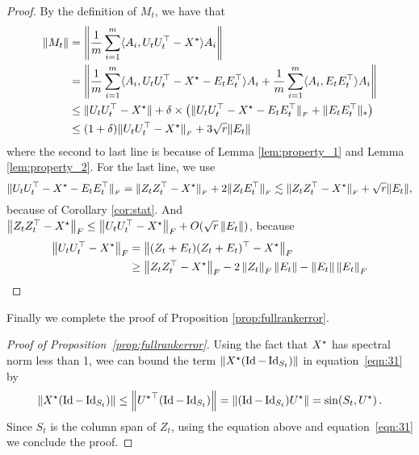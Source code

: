 \begin{proof}
	By the definition of $M_t$, we have that
	\begin{align}
		\|M_t\| & = \left\|\frac 1 m \sum_{i=1}^m \langle A_i, U_tU_t^{\top} - {X}^\star\rangle A_i\right\| \nonumber \\
		& = \left\|\frac 1 m \sum_{i=1}^m \langle A_i, U_tU_t^{\top} - {X}^\star - E_tE_t^{\top}\rangle A_i + \frac 1 m \sum_{i=1}^m \langle A_i, E_tE_t^{\top}\rangle A_i\right\| \nonumber \\
		& \le \|U_tU_t^{\top} - {X}^\star\| + \delta \times \left(\|U_tU_t^{\top} - {X}^\star - E_tE_t^{\top}\|_{_{F}} + \|E_t E_t^{\top}\|_{*}\right) \label{eq:place_8} \\
		& \le (1 + \delta) \|U_tU_t^{\top} - {X}^\star\|_{_{F}} + 3\sqrt r \|E_t\| \nonumber
	\end{align}
	where the second to last line is because of Lemma \ref{lem:property_1} and Lemma \ref{lem:property_2}.
	For the last line, we use
	\[ \|U_tU_t^{\top} - {X}^\star - E_tE_t^{\top}\|_{_{F}} = \|Z_tZ_t^{\top} - {X}^\star\|_{_{F}} + 2 \|Z_tE_t^{\top}\|_{_{F}} \lesssim \|Z_tZ_t^{\top} - {X}^\star\|_{_{F}} + \sqrt r \|E_t\|, \]
	because of Corollary \ref{cor:stat}.
	And $\left\|Z_t Z_t^{\top}- {X}^\star\right\|_F \leq \left\|U_t U_t^{\top} - {X}^\star\right\|_F  + O(\sqrt{r}\left\|E_t\right\|)$, because
	\begin{align*}
		\left\|U_t U_t^{\top} - {X}^\star\right\|_F &= \left\|(Z_t  +E_t) (Z_t + E_t)^{\top} - {X}^\star\right\|_F \\
		&\geq \left\|Z_t Z_t^{\top}- {X}^\star\right\|_F - 2\left\|Z_t\right\|_F \left\|E_t\right\| - \left\|E_t\right\|\left\|E_t\right\|_F
	\end{align*}
\end{proof}

\noindent Finally we complete the proof of Proposition \ref{prop:fullrankerror}.
\begin{proof}[Proof of Proposition~\ref{prop:fullrankerror}]
	Using the fact that ${X}^\star$ has spectral norm less than 1, wee can bound the term $ \left\|{X}^\star(\operatorname{Id} - \operatorname{Id}_{S_t})\right\|$ in equation~\eqref{eqn:31} by
	\begin{align}
	\left\|{X}^\star(\operatorname{Id} - \operatorname{Id}_{S_t})\right\|  \le	\left\|{{U}^\star}^\top (\operatorname{Id} - \operatorname{Id}_{S_t})\right\| = \left\|(\operatorname{Id} - \operatorname{Id}_{S_t}) {{U}^\star} \right\|  = \sin(S_t, {{U}^\star})\,. \nonumber
	\end{align}
	Since $S_t$ is the column span of $Z_t$, using the equation above and equation~\eqref{eqn:31} we conclude the proof. 
\end{proof}

